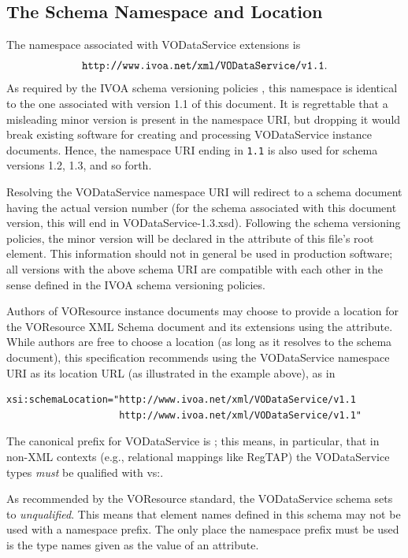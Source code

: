 \documentclass[11pt,a4paper]{ivoa}
\begin{document}
\subsection{The Schema Namespace and Location}


The namespace associated with VODataService extensions is
$$\mbox{\texttt{http://www.ivoa.net/xml/VODataService/v1.1}}.$$
As required by the IVOA schema versioning policies
\citep{2018ivoa.spec.0529H}, this namespace is identical to the one
associated with version 1.1 of this document.  It is regrettable that a
misleading minor version is present in the namespace URI, but dropping
it would break existing software for creating and processing
VODataService instance documents.  Hence, the namespace URI ending in
\verb|1.1| is also used for schema versions 1.2, 1.3, and so forth.

Resolving the VODataService namespace URI will redirect to a schema
document having the actual version number (for the schema associated
with this document version, this will end in VODataService-1.3.xsd).
Following the schema versioning policies, the minor version will be
declared in the  attribute of this file's root element.
This information should not in general be used in production software;
all versions with the above schema URI are compatible with each
other in the sense defined in the IVOA schema versioning policies.

Authors of VOResource instance documents may choose to
provide a location for the VOResource XML Schema document and its
extensions using the
 attribute.  While authors are free to
choose a location (as long as it resolves to the schema document), this
specification
recommends using the VODataService namespace URI as its location URL
(as illustrated in the example above), as in
\begin{verbatim}
xsi:schemaLocation="http://www.ivoa.net/xml/VODataService/v1.1
                    http://www.ivoa.net/xml/VODataService/v1.1"
\end{verbatim}

The canonical prefix for VODataService is ; this means, in
particular, that in non-XML contexts (e.g., relational mappings
like RegTAP) the VODataService types \emph{must} be qualified with
vs:.

As recommended by the VOResource standard, the
VODataService schema sets  to \emph{unqualified}.
This means that element names defined
in this schema may not be used with a namespace prefix.
The only place the namespace prefix must be used is the
type names given as the value of an
 attribute.
\end{document}
